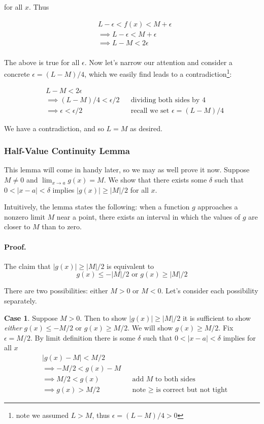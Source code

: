 for all $x$. Thus

\begin{align*}
    &L-\epsilon<f(x)<M+\epsilon\\
    &\implies L-\epsilon<M+\epsilon\\
    &\implies L-M<2\epsilon\\
\end{align*}

The above is true for all $\epsilon$. Now let's narrow our attention and
consider a concrete $\epsilon=(L-M)/4$, which we easily find leads to a
contradiction\footnote{note we assumed $L>M$, thus $\epsilon=(L-M)/4>0$}:

\begin{align*}
    &L-M<2\epsilon\\
    &\implies (L-M)/4<\epsilon/2&&\text{dividing both sides by 4}\\
    &\implies \epsilon<\epsilon/2&&\text{recall we set $\epsilon=(L-M)/4$}
\end{align*}

We have a contradiction, and so $L=M$ as desired.

\subsubsection*{Half-Value Continuity Lemma}

This lemma will come in handy later, so we may as well prove it now.
Suppose $M\neq0$ and $\lim_{x\to a}g(x)=M$. We show that there exists some
$\delta$ such that $0<|x-a|<\delta$ implies $|g(x)|\geq|M|/2$ for all $x$.

\vs

Intuitively, the lemma states the following: when a function $g$
approaches a nonzero limit $M$ near a point, there exists an interval
in which the values of $g$ are closer to $M$ than to zero.

\paragraph{Proof.} The claim that $|g(x)|\geq|M|/2$ is equivalent to
\[g(x)\leq-|M|/2 \text{\ \ \ or\ \ \ }g(x)\geq|M|/2\]

There are two possibilities: either $M>0$ or $M<0$. Let's consider
each possibility separately.

\vs

\textbf{Case 1}. Suppose $M>0$. Then to show $|g(x)|\geq|M|/2$ it is
sufficient to show \textit{either} $g(x)\leq-M/2$ or $g(x)\geq M/2$. We will
show $g(x)\geq M/2$. Fix $\epsilon=M/2$. By limit definition there is some
$\delta$ such that $0<|x-a|<\delta$ implies for all $x$
\begin{align*}
    &|g(x)-M|<M/2\\
    &\implies -M/2<g(x)-M\\
    &\implies M/2<g(x)&&\text{add $M$ to both sides}\\
    &\implies g(x)>M/2&&\text{note $\geq$ is correct but not tight}
\end{align*}

